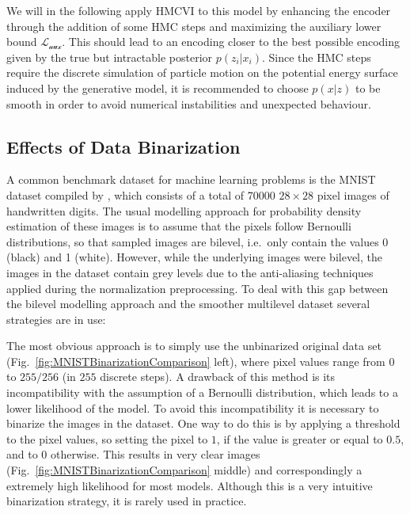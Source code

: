 \documentclass[12pt]{scrartcl}
\begin{document}
We will in the following apply HMCVI to this model by enhancing the encoder through the addition of some HMC steps and maximizing the auxiliary lower bound $\mathcal{L_\textrm{aux}}$. This should lead to an encoding closer to the best possible encoding given by the true but intractable posterior $p(z_i|x_i)$. Since the HMC steps require the discrete simulation of particle motion on the potential energy surface induced by the generative model, it is recommended to choose $p(x|z)$ to be smooth in order to avoid numerical instabilities and unexpected behaviour.

\subsection{Effects of Data Binarization}

A common benchmark dataset for machine learning problems is the MNIST dataset compiled by \citep{LeCun1998}, which consists of a total of 70000 $28 \times 28$ pixel images of handwritten digits. The usual modelling approach for probability density estimation of these images is to assume that the pixels follow Bernoulli distributions, so that sampled images are bilevel, i.e.\ only contain the values 0 (black) and 1 (white). However, while the underlying images were bilevel, the images in the dataset contain grey levels due to the anti-aliasing techniques applied during the normalization preprocessing. To deal with this gap between the bilevel modelling approach and the smoother multilevel dataset several strategies are in use:

The most obvious approach is to simply use the unbinarized original data set (Fig.~\ref{fig:MNISTBinarizationComparison} left), where pixel values range from $0$ to $255/256$ (in $255$ discrete steps). A drawback of this method is its incompatibility with the assumption of a Bernoulli distribution, which leads to a lower likelihood of the model.
To avoid this incompatibility it is necessary to binarize the images in the dataset. One way to do this is by applying a threshold to the pixel values, so setting the pixel to $1$, if the value is greater or equal to $0.5$, and to $0$ otherwise. This results in very clear images (Fig.~\ref{fig:MNISTBinarizationComparison} middle) and correspondingly a extremely high likelihood for most models. Although this is a very intuitive binarization strategy, it is rarely used in practice.
\end{document}
